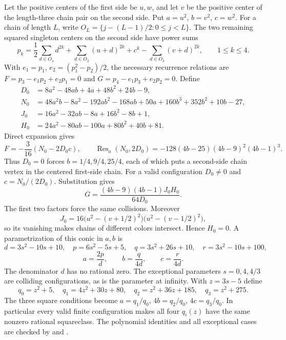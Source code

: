 Let the positive centers of the first side be $u,w$, and let $v$ be the
positive center of the length-three chain pair on the second side. Put
$a=u^2$, $b=v^2$, $c=w^2$. For a chain of length $L$, write
$O_L=\{j-(L-1)/2:0\leq j<L\}$. The two remaining squared singleton
centers on the second side have power sums
\[
 p_k=\frac12\sum_{d\in O_4}d^{2k}
       +\sum_{d\in O_2}(u+d)^{2k}+c^k
       -\sum_{d\in O_3}(v+d)^{2k},\qquad 1\leq k\leq4.
\]
With $e_1=p_1$, $e_2=(p_1^2-p_2)/2$, the necessary recurrence relations
are $F=p_3-e_1p_2+e_2p_1=0$ and
$G=p_4-e_1p_3+e_2p_2=0$. Define
\begin{align*}
 D_0&=8a^2-48ab+4a+48b^2+24b-9,\\
 N_0&=48a^2b-8a^2-192ab^2-168ab+50a
                   +160b^3+352b^2+10b-27,\\
 J_0&=16a^2-32ab-8a+16b^2-8b+1,\\
 H_0&=24a^2-80ab-100a+80b^2+40b+81.
\end{align*}
Direct expansion gives
\[
 F=-\frac3{16}(N_0-2D_0c),\qquad
 \operatorname{Res}_a(N_0,2D_0)
       =-128(4b-25)(4b-9)^2(4b-1)^3.
\]
Thus $D_0=0$ forces $b=1/4,9/4,25/4$, each of which puts a
second-side chain vertex in the centered first-side chain. For a valid
configuration $D_0\ne0$ and $c=N_0/(2D_0)$. Substitution gives
\[
 G=\frac{(4b-9)(4b-1)J_0H_0}{64D_0}.
\]
The first two factors force the same collisions. Moreover
\[
 J_0=16\bigl(u^2-(v+1/2)^2\bigr)
              \bigl(u^2-(v-1/2)^2\bigr),
\]
so its vanishing makes chains of different colors intersect. Hence
$H_0=0$. A parametrization of this conic in $a,b$ is
\[
 d=3s^2-10s+10,\quad p=6s^2-5s+5,\quad
 q=3s^2+26s+10,\quad r=3s^2-10s+100,
\]
\[
 a=\frac{2p}{d},\qquad b=\frac q{4d},\qquad c=\frac r{4d}.
\]
The denominator $d$ has no rational zero. The exceptional parameters
$s=0,4,4/3$ are colliding configurations, as is the parameter at
infinity. With $z=3s-5$ define
\begin{equation}\label{eq:t10-q}
 q_0=z^2+5,\quad q_1=4z^2+30z+80,\quad
 q_2=z^2+36z+185,\quad q_3=z^2+275.
\end{equation}
The three square conditions become $a=q_1/q_0$, $4b=q_2/q_0$,
$4c=q_3/q_0$. In particular every valid finite configuration makes
all four $q_i(z)$ have the same nonzero rational squareclass.
The polynomial identities and all exceptional cases are checked by
 and .

